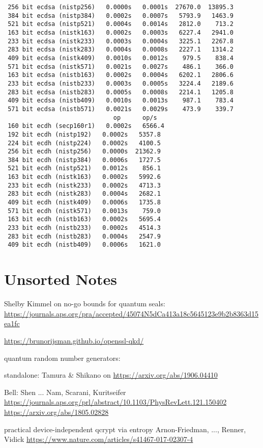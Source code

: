 \documentclass[%
 aip,
 jmp,%
 amsmath,amssymb,
 reprint,%
]{revtex4-1}
\begin{document}
\begin{verbatim}
 256 bit ecdsa (nistp256)   0.0000s   0.0001s  27670.0  13895.3
 384 bit ecdsa (nistp384)   0.0002s   0.0007s   5793.9   1463.9
 521 bit ecdsa (nistp521)   0.0004s   0.0014s   2812.0    713.2
 163 bit ecdsa (nistk163)   0.0002s   0.0003s   6227.4   2941.0
 233 bit ecdsa (nistk233)   0.0003s   0.0004s   3225.1   2267.8
 283 bit ecdsa (nistk283)   0.0004s   0.0008s   2227.1   1314.2
 409 bit ecdsa (nistk409)   0.0010s   0.0012s    979.5    838.4
 571 bit ecdsa (nistk571)   0.0021s   0.0027s    486.1    366.0
 163 bit ecdsa (nistb163)   0.0002s   0.0004s   6202.1   2806.6
 233 bit ecdsa (nistb233)   0.0003s   0.0005s   3224.4   2189.6
 283 bit ecdsa (nistb283)   0.0005s   0.0008s   2214.1   1205.8
 409 bit ecdsa (nistb409)   0.0010s   0.0013s    987.1    783.4
 571 bit ecdsa (nistb571)   0.0021s   0.0029s    473.9    339.7
                              op      op/s
 160 bit ecdh (secp160r1)   0.0002s   6566.4
 192 bit ecdh (nistp192)   0.0002s   5357.8
 224 bit ecdh (nistp224)   0.0002s   4100.5
 256 bit ecdh (nistp256)   0.0000s  21362.9
 384 bit ecdh (nistp384)   0.0006s   1727.5
 521 bit ecdh (nistp521)   0.0012s    856.1
 163 bit ecdh (nistk163)   0.0002s   5992.6
 233 bit ecdh (nistk233)   0.0002s   4713.3
 283 bit ecdh (nistk283)   0.0004s   2682.1
 409 bit ecdh (nistk409)   0.0006s   1735.8
 571 bit ecdh (nistk571)   0.0013s    759.0
 163 bit ecdh (nistb163)   0.0002s   5695.4
 233 bit ecdh (nistb233)   0.0002s   4514.3
 283 bit ecdh (nistb283)   0.0004s   2547.9
 409 bit ecdh (nistb409)   0.0006s   1621.0
\end{verbatim}

\section{Unsorted Notes}

Shelby Kimmel on no-go bounds for quantum seals:
\url{https://journals.aps.org/pra/accepted/45074N5dCa413a18c5645123e9b2b8363d15ea1fc}

\url{https://brunorijsman.github.io/openssl-qkd/}

quantum random number generators:

standalone: Tamura \& Shikano on 
\url{https://arxiv.org/abs/1906.04410}

Bell:
Shen ... Nam, Scarani, Kuritseifer
\url{https://journals.aps.org/prl/abstract/10.1103/PhysRevLett.121.150402}
\url{https://arxiv.org/abs/1805.02828}

practical device-independent qcrypt via entropy
Arnon-Friedman, ..., Renner, Vidick
\url{https://www.nature.com/articles/s41467-017-02307-4}
\end{document}
